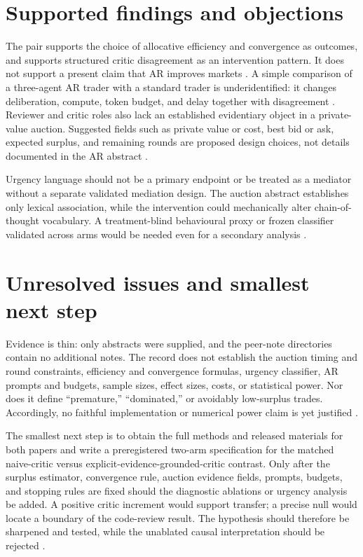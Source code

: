 \documentclass{article}
\begin{document}
\section{Supported findings and objections}

The pair supports the choice of allocative efficiency and convergence as outcomes, and supports structured critic disagreement as an intervention pattern.  It does not support a present claim that AR improves markets .  A simple comparison of a three-agent AR trader with a standard trader is underidentified: it changes deliberation, compute, token budget, and delay together with disagreement .  Reviewer and critic roles also lack an established evidentiary object in a private-value auction.  Suggested fields such as private value or cost, best bid or ask, expected surplus, and remaining rounds are proposed design choices, not details documented in the AR abstract .

Urgency language should not be a primary endpoint or be treated as a mediator without a separate validated mediation design.  The auction abstract establishes only lexical association, while the intervention could mechanically alter chain-of-thought vocabulary.  A treatment-blind behavioural proxy or frozen classifier validated across arms would be needed even for a secondary analysis .

\section{Unresolved issues and smallest next step}

Evidence is thin: only abstracts were supplied, and the peer-note directories contain no additional notes.  The record does not establish the auction timing and round constraints, efficiency and convergence formulas, urgency classifier, AR prompts and budgets, sample sizes, effect sizes, costs, or statistical power.  Nor does it define ``premature,'' ``dominated,'' or avoidably low-surplus trades.  Accordingly, no faithful implementation or numerical power claim is yet justified .

The smallest next step is to obtain the full methods and released materials for both papers and write a preregistered two-arm specification for the matched naive-critic versus explicit-evidence-grounded-critic contrast.  Only after the surplus estimator, convergence rule, auction evidence fields, prompts, budgets, and stopping rules are fixed should the diagnostic ablations or urgency analysis be added.  A positive critic increment would support transfer; a precise null would locate a boundary of the code-review result.  The hypothesis should therefore be sharpened and tested, while the unablated causal interpretation should be rejected .
\end{document}
